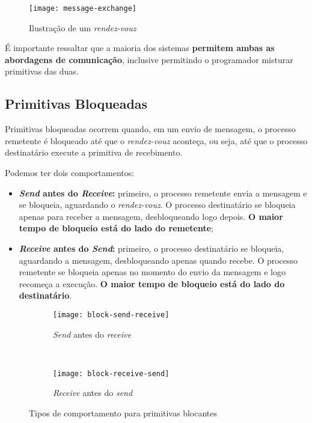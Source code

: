 \begin{figure}[h]
  \centering
  \texttt{[image: message-exchange]}
  \caption{Ilustração de um \textit{rendez-vouz}}
  \label{fig:rendez-vouz}
\end{figure}

É importante ressaltar que a maioria dos sistemas \textbf{permitem ambas as abordagens de comunicação}, inclusive permitindo o programador misturar primitivas das duas.

\subsection{Primitivas Bloqueadas}
Primitivas bloqueadas ocorrem quando, em um envio de mensagem, o processo remetente é bloqueado até que o \textit{rendez-vouz} aconteça, ou seja, até que o processo destinatário execute a primitiva de recebimento.

Podemos ter dois comportamentos:
\begin{itemize}
  \item \textbf{\textit{Send} antes do \textit{Receive}:} primeiro, o processo remetente envia a mensagem e se bloqueia, aguardando o \textit{rendez-vouz}. O processo destinatário se bloqueia apenas para receber a mensagem, desbloqueando logo depois. \textbf{O maior tempo de bloqueio está do lado do remetente};

  \item \textbf{\textit{Receive} antes do \textit{Send}:} primeiro, o processo destinatário se bloqueia, aguardando a mensagem, desbloqueando apenas quando recebe. O processo remetente se bloqueia apenas no momento do envio da mensagem e logo recomeça a execução. \textbf{O maior tempo de bloqueio está do lado do destinatário}.
\end{itemize}

\begin{figure*}[ht]
  \begin{subfigure}[t]{0.5\textwidth}
    \centering
    \texttt{[image: block-send-receive]}
    \caption{\textit{Send} antes do \textit{receive}}
    \label{subfig:block-send-receive}
  \end{subfigure}
  ~
  \begin{subfigure}[t]{0.5\textwidth}
    \centering
    \texttt{[image: block-receive-send]}
    \caption{\textit{Receive} antes do \textit{send}}
    \label{subfig:block-receive-send}
  \end{subfigure}

  \caption{Tipos de comportamento para primitivas blocantes}
  \label{fig:blocking-types}
\end{figure*}

